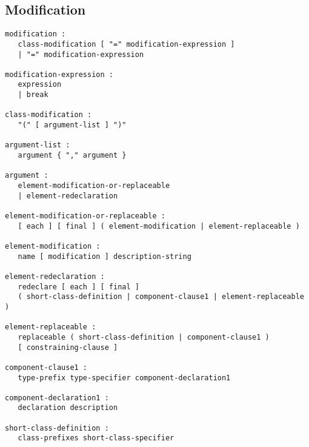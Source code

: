 \subsection{Modification}\label{modification}

\begin{lstlisting}[language=grammar]
modification :
   class-modification [ "=" modification-expression ]
   | "=" modification-expression

modification-expression :
   expression
   | break

class-modification :
   "(" [ argument-list ] ")"

argument-list :
   argument { "," argument }

argument :
   element-modification-or-replaceable
   | element-redeclaration

element-modification-or-replaceable :
   [ each ] [ final ] ( element-modification | element-replaceable )

element-modification :
   name [ modification ] description-string

element-redeclaration :
   redeclare [ each ] [ final ]
   ( short-class-definition | component-clause1 | element-replaceable )

element-replaceable :
   replaceable ( short-class-definition | component-clause1 )
   [ constraining-clause ]

component-clause1 :
   type-prefix type-specifier component-declaration1

component-declaration1 :
   declaration description

short-class-definition :
   class-prefixes short-class-specifier
\end{lstlisting}


